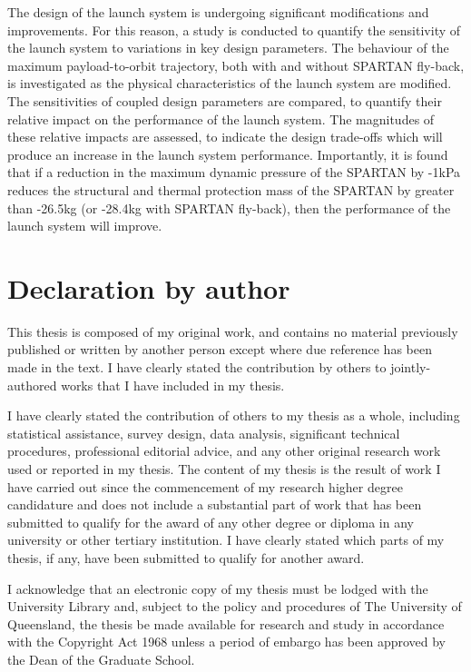 The design of the launch system is undergoing significant modifications and improvements.
For this reason, a study is conducted to quantify the sensitivity of the launch system to variations in key design parameters. The behaviour of the maximum payload-to-orbit trajectory, both with and without SPARTAN fly-back, is investigated as the physical characteristics of the launch system are modified. 
The sensitivities of coupled design parameters are compared, to quantify their relative impact on the performance of the launch system. The magnitudes of these relative impacts are assessed, to indicate the design trade-offs which will produce an increase in the launch system performance. Importantly, it is found that if a reduction in the maximum dynamic pressure of the SPARTAN by -1kPa reduces the structural and thermal protection mass of the SPARTAN by greater than -26.5kg (or -28.4kg with SPARTAN fly-back), then the performance of the launch system will improve. 

 

\clearpage
\section*{Declaration by author}

  This thesis is composed of my original work, and contains no material previously published or written by another person except where due reference has been made in the text. I have clearly stated the contribution by others to jointly-authored works that I have included in my thesis.

  I have clearly stated the contribution of others to my thesis as a whole, including statistical assistance, survey design, data analysis, significant technical procedures, professional editorial advice, and any other original research work used or reported in my thesis. The content of my thesis is the result of work I have carried out since the commencement of my research higher degree candidature and does not include a substantial part of work that has been submitted to qualify for the award of any other degree or diploma in any university or other tertiary institution. I have clearly stated which parts of my thesis, if any, have been submitted to qualify for another award.

  I acknowledge that an electronic copy of my thesis must be lodged with the University Library and, subject to the policy and procedures of The University of Queensland, the thesis be made available for research and study in accordance with the Copyright Act 1968 unless a period of embargo has been approved by the Dean of the Graduate School.

